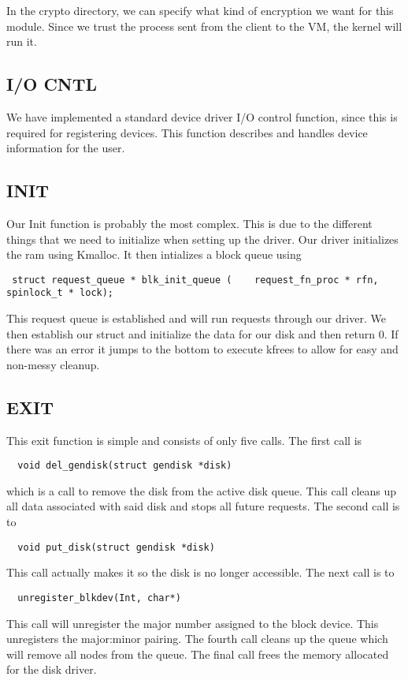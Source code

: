 \documentclass[onecolumn, draftclsnofoot,10pt, compsoc]{IEEEtran}
\begin{document}
    In the crypto directory, we can specify what kind of encryption we want for this module. Since we trust the process sent from the client to the VM, the kernel will run it. 
	\subsection{I/O CNTL}
	We have implemented a standard device driver I/O control function, since this is required for registering devices. This function describes and handles device information for the user.
    
	\subsection{INIT}
    Our Init function is probably the most complex. This is due to the different things that we need to initialize when setting up the driver. Our driver initializes the ram using Kmalloc. It then intializes a block queue using \begin{verbatim} struct request_queue * blk_init_queue (	request_fn_proc * rfn, spinlock_t * lock); \end{verbatim} This request queue is established and will run requests through our driver. We then establish our struct and initialize the data for our disk and then return 0. If there was an error it jumps to the bottom to execute kfrees to allow for easy and non-messy cleanup.
    
    \subsection{EXIT}
    
    This exit function is simple and consists of only five calls. The first call is \begin{verbatim}  void del_gendisk(struct gendisk *disk) \end{verbatim} which is a call to remove the disk from the active disk queue. This call cleans up all data associated with said disk and stops all future requests. The second call is to \begin{verbatim}  void put_disk(struct gendisk *disk) \end{verbatim} This call actually makes it so the disk is no longer accessible. The next call is to \begin{verbatim}  unregister_blkdev(Int, char*) \end{verbatim} This call will unregister the major number assigned to the block device. This unregisters the major:minor pairing. The fourth call cleans up the queue which will remove all nodes from the queue. The final call frees the memory allocated for the disk driver.
\end{document}
